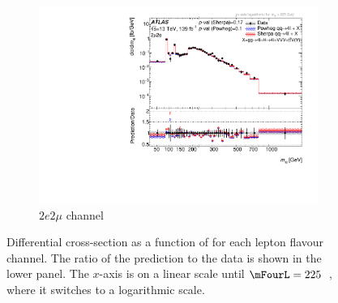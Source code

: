\begin{figure}[htb!]
\begin{subfigure}{.49\textwidth}
      \includegraphics[width=.99\linewidth]{Figures/m4l/UnfoldedResults/linlog_Unfolded_Data_m4l_event_type2mu2e.pdf}  \caption{$2e2\mu$ channel}\label{fig:sub-third}
    \end{subfigure}
    \caption{Differential cross-section as a function of \mFourL{} for each lepton flavour channel. \errorbars{} \SMpredictions{} \Pvalue{} The ratio of the \SHERPA{} prediction to the data is shown in the lower panel. The $x$-axis is on a linear scale until $\mFourL = 225$~\GeV, where it switches to a logarithmic scale.}
    \label{fig:m4l_flavour}
\end{figure}

